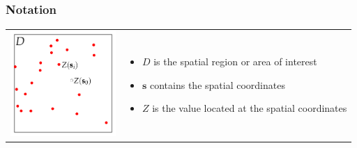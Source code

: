 \documentclass[mathserif,compress]{beamer}\usepackage{graphicx, color}
\def\bit{\begin{itemize}}
\def\eit{\end{itemize}}
\def\bs{\mathbf{s}}
\begin{document}
\subsection{}
\begin{frame} [fragile]
\frametitle{Notation}




	\vspace{.2cm}
	\begin{tabular} {p{4cm} p{5cm}}

 		\vspace{.2cm}
		\includegraphics[width=4.0cm]{figure/Notation-plot} &
		\vspace{.5cm}
		\bit
			\item{$D$ is the spatial region or area of interest} 
			\item{$\bs$ contains the spatial coordinates}
			\item{$Z$ is the value located at the spatial coordinates}
		\eit

	\end{tabular}

\end{frame}
\end{document}
